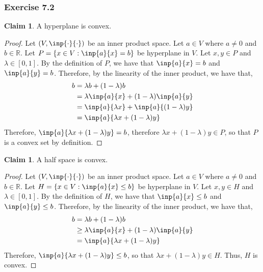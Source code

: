 \documentclass[letterpaper,12pt]{article}
\theoremstyle{definition}
\newtheorem{claim}[theorem]{Claim}
\begin{document}
\subsubsection*{Exercise 7.2}
\begin{claim}
	A hyperplane is convex.
\end{claim}
\begin{proof}
	Let $(V, \inp{\cdot}{\cdot})$ be an inner product space. Let $a \in V$ where $a \neq 0$ and $b \in \mathbb{R}$. Let $P = \{x \in V : \inp{a}{x} = b\}$ be hyperplane in $V$. Let $x, y \in P$ and $\lambda \in [0,1]$. By the definition of $P$, we have that $\inp{a}{x} = b$ and $\inp{a}{y} = b$. Therefore, by the linearity of the inner product, we have that,
	\begin{align*}
	b &= \lambda b + (1 - \lambda)b \\
	&= \lambda \inp{a}{x} + (1 - \lambda) \inp{a}{y} \\
	&= \inp{a}{\lambda x} +  \inp{a}{(1-\lambda)y} \\
	&= \inp{a}{\lambda x + (1-\lambda)y}
	\end{align*}
	Therefore, $\inp{a}{\lambda x + (1-\lambda)y} = b$, therefore $\lambda x + (1-\lambda)y \in P$, so that $P$ is a convex set by definition.
\end{proof}
\begin{claim}
	A half space is convex.
\end{claim}
\begin{proof}
	Let $(V, \inp{\cdot}{\cdot})$ be an inner product space. Let $a \in V$ where $a \neq 0$ and $b \in \mathbb{R}$. Let $H = \{x \in V : \inp{a}{x} \leq b\}$ be hyperplane in $V$. Let $x, y \in H$ and $\lambda \in [0,1]$. By the definition of $H$, we have that $\inp{a}{x} \leq b$ and $\inp{a}{y} \leq b$. Therefore, by the linearity of the inner product, we have that,
	\begin{align*}
	b &= \lambda b +  (1 - \lambda) b \\
	&\geq \lambda \inp{a}{x} + (1 - \lambda) \inp{a}{y} \\
	&= \inp{a}{\lambda x + (1-\lambda)y} 
	\end{align*}
	Therefore, $\inp{a}{\lambda x + (1-\lambda)y} \leq b$, so that $\lambda x + (1-\lambda)y \in H$. Thus, $H$ is convex.
\end{proof}
\end{document}
